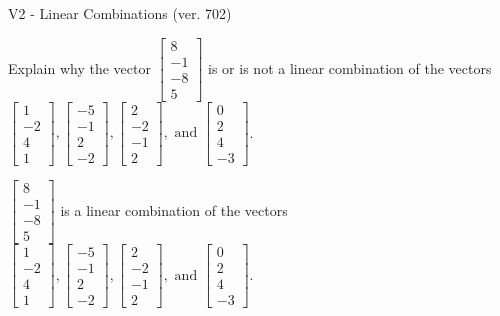 \begin{exercise}
  \begin{exerciseTitle}V2 - Linear Combinations (ver. 702)\end{exerciseTitle}
  \begin{exerciseStatement}
    Explain why the vector \(\left[\begin{array}{c}
8 \\
-1 \\
-8 \\
5
\end{array}\right]\)  is or is not a linear 
	combination of the vectors \(\left[\begin{array}{c}
1 \\
-2 \\
4 \\
1
\end{array}\right] , \left[\begin{array}{c}
-5 \\
-1 \\
2 \\
-2
\end{array}\right] , \left[\begin{array}{c}
2 \\
-2 \\
-1 \\
2
\end{array}\right] , \text{ and } \left[\begin{array}{c}
0 \\
2 \\
4 \\
-3
\end{array}\right]\).
	


  \end{exerciseStatement}
  \begin{exerciseAnswer}
   \(\left[\begin{array}{c}
8 \\
-1 \\
-8 \\
5
\end{array}\right]\) 
  	 is  
	a linear combination of the vectors \(\left[\begin{array}{c}
1 \\
-2 \\
4 \\
1
\end{array}\right] , \left[\begin{array}{c}
-5 \\
-1 \\
2 \\
-2
\end{array}\right] , \left[\begin{array}{c}
2 \\
-2 \\
-1 \\
2
\end{array}\right] , \text{ and } \left[\begin{array}{c}
0 \\
2 \\
4 \\
-3
\end{array}\right]\).


\end{exerciseAnswer}
\end{exercise}
